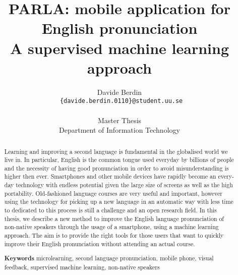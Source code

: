 \documentclass{report}
\title{PARLA: mobile application for English pronunciation \\ A supervised machine learning approach}
\author{Davide Berdin \\
  \texttt{ \{davide.berdin.0110\}@student.uu.se} \\
  \\ Master Thesis
  \\ Department of Information Technology}
\newcommand\blankpage{%
    \null
    \thispagestyle{empty}%
    \addtocounter{page}{-1}%
    \newpage}
\begin{document}
\maketitle


\blankpage

\blankpage

\begin{abstract}
Learning and improving a second language is fundamental in the globalised world we live in. In particular, English is the common tongue used everyday by billions of people and the necessity of having good pronunciation in order to avoid misunderstanding is higher then ever. Smartphones and other mobile devices have rapidly become an every-day technology with endless potential given the large size of screens as well as the high portability. Old-fashioned language courses are very useful and important, however using the technology for picking up a new language in an automatic way with less time to dedicated to this process is still a challenge and an open research field. In this thesis, we describe a new method to improve the English language pronunciation of non-native speakers through the usage of a smartphone, using a machine learning approach. The aim is to provide the right tools for those users that want to quickly improve their English pronunciation without attending an actual course. \vspace{7in}


\textbf{Keywords} microlearning, second language pronunciation, mobile phone, visual feedback, supervised machine learning, non-native speakers
\end{abstract}

\blankpage
\end{document}

